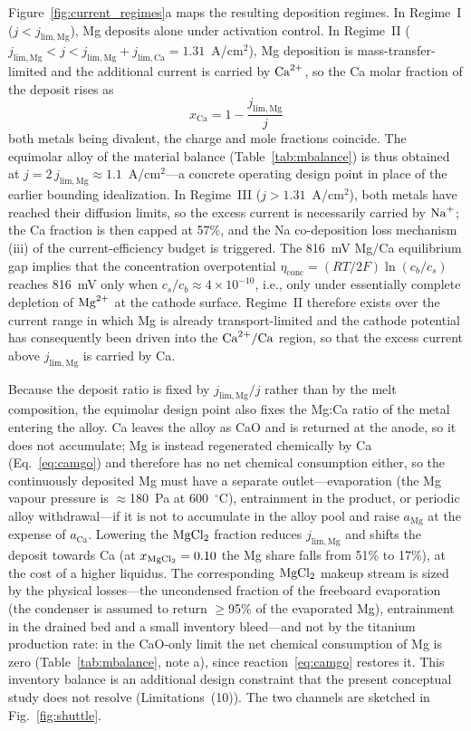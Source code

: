 \documentclass[pdflatex,sn-basic,Numbered]{sn-jnl}
\begin{document}
Figure~\ref{fig:current_regimes}a maps the resulting deposition regimes. In Regime~I ($j < j_{\mathrm{lim,Mg}}$), Mg deposits alone under activation control. In Regime~II ($j_{\mathrm{lim,Mg}} < j < j_{\mathrm{lim,Mg}} + j_{\mathrm{lim,Ca}} = 1.31$~A/cm$^2$), Mg deposition is mass-transfer-limited and the additional current is carried by $\ce{Ca^{2+}}$, so the Ca molar fraction of the deposit rises as
\begin{equation}
\label{eq:xca}
x_{\mathrm{Ca}} = 1 - \frac{j_{\mathrm{lim,Mg}}}{j}
\end{equation}
both metals being divalent, the charge and mole fractions coincide. The equimolar alloy of the material balance (Table~\ref{tab:mbalance}) is thus obtained at $j = 2\,j_{\mathrm{lim,Mg}} \approx 1.1$~A/cm$^2$---a concrete operating design point in place of the earlier bounding idealization. In Regime~III ($j > 1.31$~A/cm$^2$), both metals have reached their diffusion limits, so the excess current is necessarily carried by $\ce{Na+}$; the Ca fraction is then capped at 57\%, and the Na co-deposition loss mechanism (iii) of the current-efficiency budget is triggered. The 816~mV Mg/Ca equilibrium gap implies that the concentration overpotential $\eta_{\mathrm{conc}} = (RT/2F)\ln(c_b/c_s)$ reaches 816~mV only when $c_s/c_b \approx 4\times10^{-10}$, i.e., only under essentially complete depletion of $\ce{Mg^{2+}}$ at the cathode surface. Regime~II therefore exists over the current range in which Mg is already transport-limited and the cathode potential has consequently been driven into the $\ce{Ca^{2+}/Ca}$ region, so that the excess current above $j_{\mathrm{lim,Mg}}$ is carried by Ca.

Because the deposit ratio is fixed by $j_{\mathrm{lim,Mg}}/j$ rather than by the melt composition, the equimolar design point also fixes the Mg:Ca ratio of the metal entering the alloy. Ca leaves the alloy as CaO and is returned at the anode, so it does not accumulate; Mg is instead regenerated chemically by Ca (Eq.~\ref{eq:camgo}) and therefore has no net chemical consumption either, so the continuously deposited Mg must have a separate outlet---evaporation (the Mg vapour pressure is $\approx$180~Pa at 600~$^{\circ}$C), entrainment in the product, or periodic alloy withdrawal---if it is not to accumulate in the alloy pool and raise $a_{\mathrm{Mg}}$ at the expense of $a_{\mathrm{Ca}}$. Lowering the $\ce{MgCl2}$ fraction reduces $j_{\mathrm{lim,Mg}}$ and shifts the deposit towards Ca (at $x_{\ce{MgCl2}} = 0.10$ the Mg share falls from 51\% to 17\%), at the cost of a higher liquidus. The corresponding $\ce{MgCl2}$ makeup stream is sized by the physical losses---the uncondensed fraction of the freeboard evaporation (the condenser is assumed to return $\geq$95\% of the evaporated Mg), entrainment in the drained bed and a small inventory bleed---and not by the titanium production rate: in the CaO-only limit the net chemical consumption of Mg is zero (Table~\ref{tab:mbalance}, note a), since reaction~\ref{eq:camgo} restores it. This inventory balance is an additional design constraint that the present conceptual study does not resolve (Limitations~(10)). The two channels are sketched in Fig.~\ref{fig:shuttle}.
\end{document}
